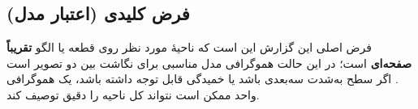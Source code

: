 \subsection{فرض کلیدی (اعتبار مدل)}
فرض اصلی این گزارش این است که ناحیهٔ مورد نظر روی قطعه یا الگو \textbf{تقریباً صفحه‌ای} است؛ در این حالت هموگرافی مدل مناسبی برای نگاشت بین دو تصویر است \cite{HartleyZisserman2004}. اگر سطح به‌شدت سه‌بعدی باشد یا خمیدگی قابل توجه داشته باشد، یک هموگرافی واحد ممکن است نتواند کل ناحیه را دقیق توصیف کند.
